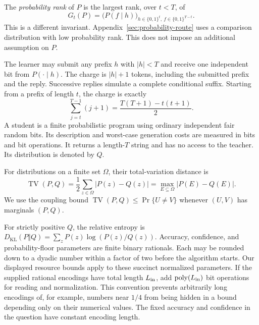 \documentclass[11pt]{article}
\newcommand{\TV}{\operatorname{TV}}
\newcommand{\KL}{D_{\mathrm{KL}}}
\newcommand{\poly}{\operatorname{poly}}
\theoremstyle{definition}
\theoremstyle{remark}
\begin{document}
The \emph{probability rank} of $P$ is the largest rank, over $t<T$, of
\[
G_t(P)=\bigl(P(f\mid h)\bigr)_{
h\in\{0,1\}^t,\ f\in\{0,1\}^{T-t}}.
\]
This is a different invariant. Appendix~\ref{sec:probability-route} uses a comparison distribution with low probability rank. This does not impose an additional assumption on $P$.

The learner may submit any prefix $h$ with $|h|<T$ and receive one independent bit from $P(\cdot\mid h)$. The charge is $|h|+1$ tokens, including the submitted prefix and the reply. Successive replies simulate a complete conditional suffix. Starting from a prefix of length $t$, the charge is exactly
\begin{equation}\label{eq:suffix-charge}
\sum_{j=t}^{T-1}(j+1)
=\frac{T(T+1)-t(t+1)}2.
\end{equation}
A student is a finite probabilistic program using ordinary independent fair random bits. Its description and worst-case generation costs are measured in bits and bit operations. It returns a length-$T$ string and has no access to the teacher. Its distribution is denoted by $Q$.

For distributions on a finite set $\Omega$, their total-variation distance is
\[
\TV(P,Q)=\frac12\sum_{z\in\Omega}|P(z)-Q(z)|
=\max_{E\subseteq\Omega}|P(E)-Q(E)|.
\]
We use the coupling bound $\TV(P,Q)\le\Pr\{U\ne V\}$ whenever $(U,V)$ has marginals $(P,Q)$.

For strictly positive $Q$, the relative entropy is
$\KL(P\Vert Q)=\sum_zP(z)\log(P(z)/Q(z))$.
Accuracy, confidence, and probability-floor parameters are finite binary rationals. Each may be rounded down to a dyadic number within a factor of two before the algorithm starts. Our displayed resource bounds apply to these succinct normalized parameters. If the supplied rational encodings have total length $L_{\rm in}$, add $\poly(L_{\rm in})$ bit operations for reading and normalization. This convention prevents arbitrarily long encodings of, for example, numbers near $1/4$ from being hidden in a bound depending only on their numerical values. The fixed accuracy and confidence in the question have constant encoding length.
\end{document}
